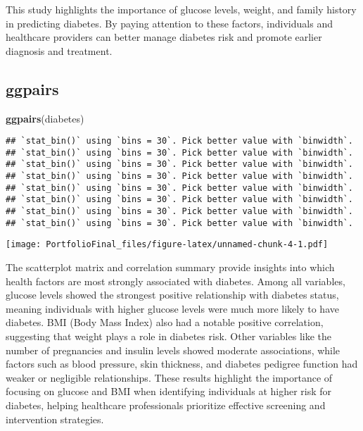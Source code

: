 \documentclass[
]{article}
\newenvironment{Shaded}{\begin{snugshade}}{\end{snugshade}}
\newcommand{\FunctionTok}[1]{\textcolor[rgb]{0.13,0.29,0.53}{\textbf{#1}}}
\newcommand{\NormalTok}[1]{#1}
\begin{document}
This study highlights the importance of glucose levels, weight, and
family history in predicting diabetes. By paying attention to these
factors, individuals and healthcare providers can better manage diabetes
risk and promote earlier diagnosis and treatment.

\subsection{ggpairs}\label{ggpairs}

\begin{Shaded}
\begin{Highlighting}[]
\FunctionTok{ggpairs}\NormalTok{(diabetes)}
\end{Highlighting}
\end{Shaded}

\begin{verbatim}
## `stat_bin()` using `bins = 30`. Pick better value with `binwidth`.
## `stat_bin()` using `bins = 30`. Pick better value with `binwidth`.
## `stat_bin()` using `bins = 30`. Pick better value with `binwidth`.
## `stat_bin()` using `bins = 30`. Pick better value with `binwidth`.
## `stat_bin()` using `bins = 30`. Pick better value with `binwidth`.
## `stat_bin()` using `bins = 30`. Pick better value with `binwidth`.
## `stat_bin()` using `bins = 30`. Pick better value with `binwidth`.
## `stat_bin()` using `bins = 30`. Pick better value with `binwidth`.
\end{verbatim}

\texttt{[image: PortfolioFinal\_files/figure-latex/unnamed-chunk-4-1.pdf]}

The scatterplot matrix and correlation summary provide insights into
which health factors are most strongly associated with diabetes. Among
all variables, glucose levels showed the strongest positive relationship
with diabetes status, meaning individuals with higher glucose levels
were much more likely to have diabetes. BMI (Body Mass Index) also had a
notable positive correlation, suggesting that weight plays a role in
diabetes risk. Other variables like the number of pregnancies and
insulin levels showed moderate associations, while factors such as blood
pressure, skin thickness, and diabetes pedigree function had weaker or
negligible relationships. These results highlight the importance of
focusing on glucose and BMI when identifying individuals at higher risk
for diabetes, helping healthcare professionals prioritize effective
screening and intervention strategies.
\end{document}
